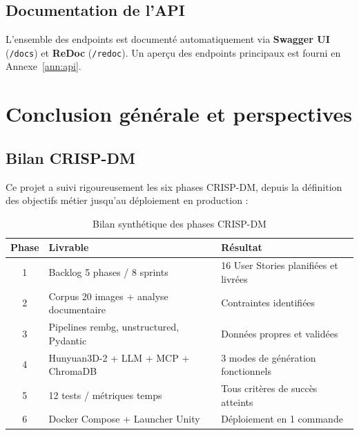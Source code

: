 \documentclass[12pt,a4paper,oneside]{report}
\begin{document}
\section{Documentation de l'API}

L'ensemble des endpoints est documenté automatiquement via \textbf{Swagger UI}
(\texttt{/docs}) et \textbf{ReDoc} (\texttt{/redoc}). Un aperçu des endpoints
principaux est fourni en Annexe~\ref{ann:api}.

\cleardoublepage
\chapter*{Conclusion générale et perspectives}

\section*{Bilan CRISP-DM}

Ce projet a suivi rigoureusement les six phases CRISP-DM, depuis la
définition des objectifs métier jusqu'au déploiement en production :

\begin{table}[H]
\centering
\caption{Bilan synthétique des phases CRISP-DM}
\label{tab:crisp-bilan}
\begin{tabularx}{\linewidth}{@{}clX@{}}
\toprule
\textbf{Phase} & \textbf{Livrable} & \textbf{Résultat} \\\midrule
1 & Backlog 5 phases / 8 sprints & 16 User Stories planifiées et livrées \\
2 & Corpus 20 images + analyse documentaire & Contraintes identifiées \\
3 & Pipelines rembg, unstructured, Pydantic & Données propres et validées \\
4 & Hunyuan3D-2 + LLM + MCP + ChromaDB & 3 modes de génération fonctionnels \\
5 & 12 tests / métriques temps & Tous critères de succès atteints \\
6 & Docker Compose + Launcher Unity & Déploiement en 1 commande \\
\bottomrule
\end{tabularx}
\end{table}
\end{document}
